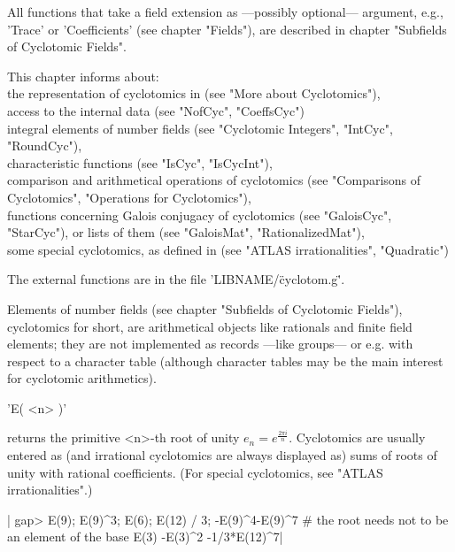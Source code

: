 All functions that take  a field  extension as ---possibly optional---
argument, e.g., 'Trace' or 'Coefficients'  (see chapter "Fields"), are
described in chapter "Subfields of Cyclotomic Fields".

This chapter informs about:\\
    the representation of cyclotomics in {\GAP} (see
       "More about Cyclotomics"),\\
    access to the internal data (see "NofCyc", "CoeffsCyc")\\
    integral elements of number fields (see "Cyclotomic Integers",
       "IntCyc", "RoundCyc"),\\
    characteristic functions (see "IsCyc", "IsCycInt"),\\
    comparison and arithmetical operations of cyclotomics (see
    "Comparisons of Cyclotomics", "Operations for Cyclotomics"),\\
    functions concerning Galois conjugacy of cyclotomics (see "GaloisCyc",
       "StarCyc"), or lists of them (see "GaloisMat", "RationalizedMat"),\\
    some special cyclotomics, as defined in \cite{CCN85}
       (see "ATLAS irrationalities", "Quadratic")

The external functions are in the file 'LIBNAME/\"cyclotom.g\"'.


Elements  of  number  fields  (see  chapter  "Subfields of  Cyclotomic
Fields"),  cyclotomics  for  short,  are  arithmetical  objects   like
rationals  and  finite  field  elements;  they are not implemented  as
records ---like  groups--- or e.g. with respect  to a character  table
(although  character  tables  may be the main  interest for cyclotomic
arithmetics).

'E( <n> )'

returns  the  primitive <n>-th  root  of unity  $e_n  =  e^{\frac{2\pi
i}{n}}$.   Cyclotomics  are   usually  entered   as   (and  irrational
cyclotomics  are  always displayed  as) sums of  roots of  unity  with
rational   coefficients.    (For  special   cyclotomics,   see  "ATLAS
irrationalities".)

|    gap> E(9); E(9)^3; E(6); E(12) / 3; 
    -E(9)^4-E(9)^7    # the root needs not to be an element of the base
    E(3)
    -E(3)^2
    -1/3*E(12)^7|

